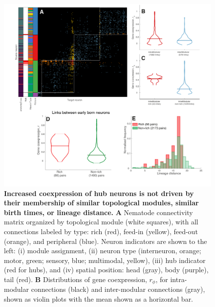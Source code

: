 \documentclass[10pt,letterpaper]{article}
\begin{document}
\begin{figure}[!h]
\centering
    \includegraphics[width=1\textwidth]{extrasALL.pdf}
 \caption{
 \textbf{Increased coexpression of hub neurons is not driven by their membership of similar topological modules, similar birth times, or lineage distance.}
\textbf{A} Nematode connectivity matrix organized by topological module (white squares), with all connections labeled by type: rich (red), feed-in (yellow), feed-out (orange), and peripheral (blue).
Neuron indicators are shown to the left:
(i) module assignment,
(ii) neuron type (interneuron, orange; motor, green; sensory, blue; multimodal, yellow),
(iii) hub indicator (red for hubs), and
(iv) spatial position: head (gray), body (purple), tail (red).
\textbf{B} Distributions of gene coexpression, $r_\phi$, for intra-modular connections (black) and inter-modular connections (gray), shown as violin plots with the mean shown as a horizontal bar.
}
\end{figure}
\end{document}

